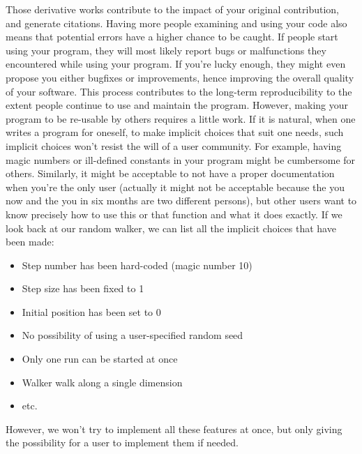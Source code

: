 \documentclass[a4paper,11pt]{article}
\begin{document}
Those derivative works contribute to the impact of your original contribution,
and generate citations. Having more people examining and using your code also
means that potential errors have a higher chance to be caught. If people start
using your program, they will most likely report bugs or malfunctions they
encountered while using your program. If you're lucky enough, they might even
propose you either bugfixes or improvements, hence improving the overall
quality of your software. This process contributes to the long-term
reproducibility to the extent people continue to use and maintain the program.
%
However, making your program to be re-usable by others requires a little
work. If it is natural, when one writes a program for oneself, to make implicit
choices that suit one needs, such implicit choices won't resist the will of a
user community. For example, having magic numbers or ill-defined constants in
your program might be cumbersome for others. Similarly, it might be acceptable
to not have a proper documentation when you're the only user (actually it might
not be acceptable because the you now and the you in six months are two
different persons), but other users want to know precisely how to use this or
that function and what it does exactly.
%
If we look back at our random walker, we can list all the implicit choices that
have been made:
\begin{itemize}
\item Step number has been hard-coded (magic number 10)
\item Step size has been fixed to 1
\item Initial position has been set to 0
\item No possibility of using a user-specified random seed
\item Only one run can be started at once
\item Walker walk along a single dimension
\item etc.
\end{itemize}
However, we won't try to implement all these features at once, but only giving the possibility for a user to implement them if needed.
\end{document}

